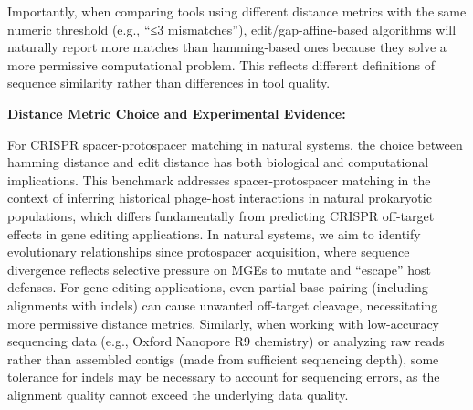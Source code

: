 \documentclass[
]{article}
\begin{document}
Importantly, when comparing tools using different distance metrics with
the same numeric threshold (e.g., ``≤3 mismatches''),
edit/gap-affine-based algorithms will naturally report more matches than
hamming-based ones because they solve a more permissive computational
problem. This reflects different definitions of sequence similarity
rather than differences in tool quality.

\textbf{Distance Metric Choice and Experimental Evidence:}

For CRISPR spacer-protospacer matching in natural systems, the choice
between hamming distance and edit distance has both biological and
computational implications. This benchmark addresses spacer-protospacer
matching in the context of inferring historical phage-host interactions
in natural prokaryotic populations, which differs fundamentally from
predicting CRISPR off-target effects in gene editing applications. In
natural systems, we aim to identify evolutionary relationships since
protospacer acquisition, where sequence divergence reflects selective
pressure on MGEs to mutate and ``escape'' host defenses. For gene
editing applications, even partial base-pairing (including alignments
with indels) can cause unwanted off-target cleavage, necessitating more
permissive distance metrics. Similarly, when working with low-accuracy
sequencing data (e.g., Oxford Nanopore R9 chemistry\autocite{Jain_2016})
or analyzing raw reads rather than assembled contigs (made from
sufficient sequencing depth), some tolerance for indels may be necessary
to account for sequencing errors, as the alignment quality cannot exceed
the underlying data quality.
\end{document}
